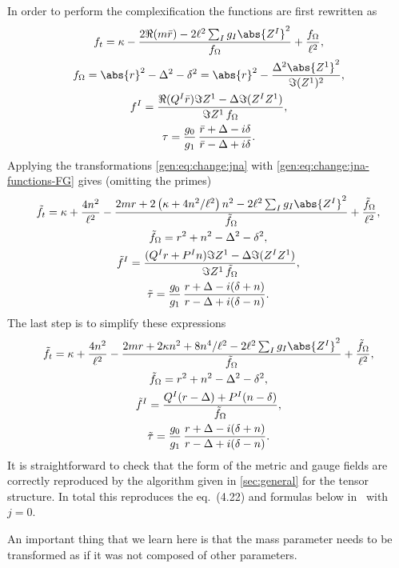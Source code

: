 In order to perform the complexification the functions are first rewritten as
\begin{subequations}
\begin{gather}
	f_t = \kappa
		- \frac{2 \Re(m \bar r) - 2 \ell^2 \sum_I g_I \abs{Z^I}^2}{f_\Omega}
		+ \frac{f_\Omega}{\ell^2}, \\
	f_\Omega = \abs{r}^2 - \Delta^2 - \delta^2
		= \abs{r}^2 - \frac{\Delta^2 \abs{Z^1}^2}{\Im(Z^1)^2}, \\
	f^I
		= \frac{\Re(Q^I \bar r) \Im Z^1 - \Delta \Im(Z^I Z^1)}{\Im Z^1\, f_\Omega}, \\
	\tau = \frac{g_0}{g_1}\, \frac{\bar r + \Delta - i \delta}{\bar r - \Delta + i \delta}.
\end{gather}
\end{subequations}
Applying the transformations \eqref{gen:eq:change:jna} with \eqref{gen:eq:change:jna-functions-FG} gives (omitting the primes)
\begin{subequations}
\begin{gather}
	\tilde f_t = \kappa + \frac{4 n^2}{\ell^2}
		- \frac{2 m r + 2 \left(\kappa + 4 n^2 / \ell^2 \right) n^2 - 2 \ell^2 \sum_I g_I \abs{Z^I}^2}{\tilde f_\Omega}
		+ \frac{\tilde f_\Omega}{\ell^2}, \\
	\tilde f_\Omega = r^2 + n^2 - \Delta^2 - \delta^2, \\
	\tilde f^I = \frac{(Q^I r + P^I n) \Im Z^1 - \Delta \Im(Z^I Z^1)}{\Im Z^1\, \tilde f_\Omega}, \\
	\tilde \tau = \frac{g_0}{g_1}\, \frac{r + \Delta - i (\delta + n)}{r - \Delta + i (\delta - n)}.
\end{gather}
\end{subequations}
The last step is to simplify these expressions
\begin{subequations}
\begin{gather}
	\tilde f_t = \kappa + \frac{4 n^2}{\ell^2}
		- \frac{2 m r + 2 \kappa n^2 + 8 n^4 / \ell^2 - 2 \ell^2 \sum_I g_I \abs{Z^I}^2}{\tilde f_\Omega}
		+ \frac{\tilde f_\Omega}{\ell^2}, \\
	\tilde f_\Omega = r^2 + n^2 - \Delta^2 - \delta^2, \\
	\tilde f^I = \frac{Q^I (r - \Delta) + P^I (n - \delta)}{\tilde f_\Omega}, \\
	\tilde \tau = \frac{g_0}{g_1}\, \frac{r + \Delta - i (\delta + n)}{r - \Delta + i (\delta - n)}.
\end{gather}
\end{subequations}
It is straightforward to check that the form of the metric and gauge fields are correctly reproduced by the algorithm given in \cref{sec:general} for the tensor structure.
In total this reproduces the eq.\ (4.22) and formulas below in~\cite{Gnecchi:2014:RotatingBlackHoles} with $j = 0$.


An important thing that we learn here is that the mass parameter needs to be transformed as if it was not composed of other parameters.
